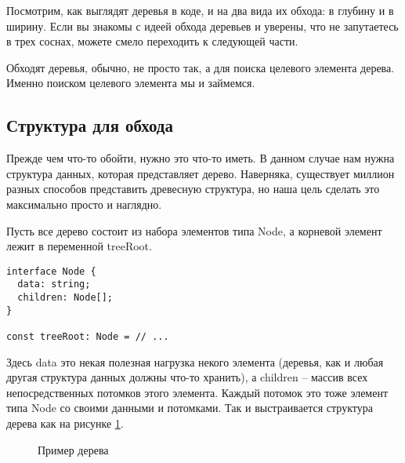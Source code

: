 \documentclass[../../article]{subfiles}
\begin{document}
{Посмотрим, как выглядят деревья в коде, и на два вида их обхода: в глубину и в ширину. Если вы знакомы с идеей обхода деревьев и уверены, что не запутаетесь в трех соснах, можете смело переходить к следующей части.}

Обходят деревья, обычно, не просто так, а для поиска целевого элемента дерева. Именно поиском целевого элемента мы и займемся.

\subsection{Структура для обхода}

Прежде чем что-то обойти, нужно это что-то иметь. В данном случае нам нужна структура данных, которая представляет дерево. Наверняка, существует миллион разных способов представить древесную структура, но наша цель сделать это максимально просто и наглядно.

Пусть все дерево состоит из набора элементов типа {\firacodebold Node}, а корневой элемент лежит в переменной {\firacodebold treeRoot}.
    \begin{ruledelement}
        \begin{lstlisting}[label={lst:treeStructure}]
interface Node {
  data: string;
  children: Node[];
}

const treeRoot: Node = // ...
        \end{lstlisting}
    \end{ruledelement}

Здесь {\firacodebold data} это некая полезная нагрузка некого элемента (деревья, как и любая другая структура данных должны что-то хранить), а {\firacodebold children} – массив всех непосредственных потомков этого элемента. Каждый потомок это тоже элемент типа {\firacodebold Node} со своими данными и потомками. Так и выстраивается структура дерева как на рисунке \ref{fig:exampleTree}.

\begin{figure}
    \caption{Пример дерева}
    \label{fig:exampleTree}
\end{figure}
\end{document}
